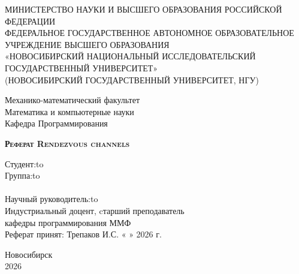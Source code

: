 \documentclass[a4paper,12pt]{article}
\date{}
\newcommand{\fromto}[2]{#1 \xrfill[.0ex]{.10pt} #2}
\newcommand{\fromtotriple}[3]{#1 \xrfill[.0ex]{.10pt} #2 \xrfill[.0ex]{.10pt} #3}
\begin{document}
\begin{titlepage}
\newpage

\begin{center}
МИНИСТЕРСТВО НАУКИ И ВЫСШЕГО ОБРАЗОВАНИЯ РОССИЙСКОЙ ФЕДЕРАЦИИ \\
ФЕДЕРАЛЬНОЕ ГОСУДАРСТВЕННОЕ АВТОНОМНОЕ ОБРАЗОВАТЕЛЬНОЕ УЧРЕЖДЕНИЕ ВЫСШЕГО ОБРАЗОВАНИЯ \\
 «НОВОСИБИРСКИЙ НАЦИОНАЛЬНЫЙ ИССЛЕДОВАТЕЛЬСКИЙ ГОСУДАРСТВЕННЫЙ УНИВЕРСИТЕТ» \\
(НОВОСИБИРСКИЙ ГОСУДАРСТВЕННЫЙ УНИВЕРСИТЕТ, НГУ)
\end{center}

\vspace{8em}

\begin{center}
\Large Механико-математический факультет \\ 
\Large Математика и компьютерные науки \\
\Large Кафедра Программирования
\end{center}

\vspace{2em}

\begin{center}
\textsc{\textbf{Реферат \linebreak Rendezvous channels}}
\end{center}

\vspace{6em}

\newbox{\lbox}
\newlength{\maxl}
\setlength{\maxl}{\wd\lbox}
\hfill\parbox{11cm}{
\hspace*{5cm}\hspace*{-5cm}Студент:\hfill\hbox to\\
\hspace*{5cm}\hspace*{-5cm}Группа:\hfill\hbox to\\
\\
\hspace*{5cm}\hspace*{-5cm}Научный руководитель:\hfill\hbox to\\
\hspace*{5cm}\hspace*{-5cm}Индустриальный доцент, cтарший преподаватель \\ кафедры программирования ММФ\\

\fromto{Реферат принят:}{Трепаков И.С.}
\newline
\fromtotriple{«}{»}{2026 г.}
}


\vspace{\fill}

\begin{center}
Новосибирск \\2026
\end{center}

\end{titlepage}
\end{document}
